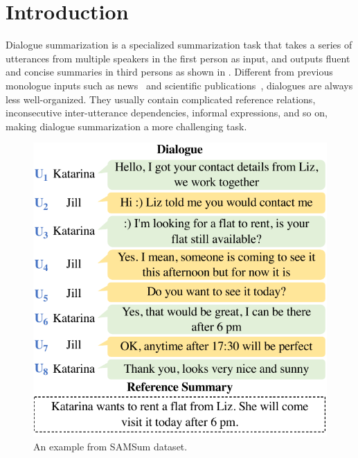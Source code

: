\section{Introduction}

Dialogue summarization is a specialized summarization task that takes
a series of utterances from multiple speakers in the first person as input,
and outputs fluent and concise summaries in third persons as shown in 
. 
Different from previous monologue inputs such as news~\cite{narayan2018don} and scientific publications~\cite{cohan2018discourse}, dialogues are always less well-organized. They usually contain complicated reference relations, inconsecutive inter-utterance dependencies, informal expressions, and so on, making dialogue summarization a more challenging task.

\begin{figure}[th]
	\centering
	\includegraphics[width=0.75\columnwidth]{example.pdf}
	\caption{An example from SAMSum dataset. %
	}
	\label{fig:example}
\end{figure}



